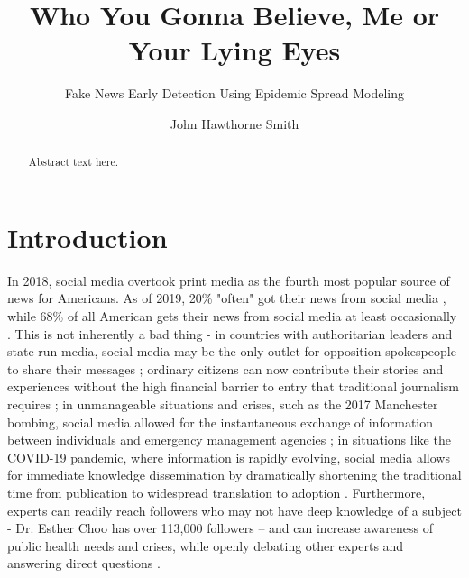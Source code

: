 \documentclass[NETN,manuscript]{stjour-new}
\begin{document}
\title[Who You Gonna Believe?]{Who You Gonna Believe, Me or Your Lying Eyes}
\subtitle{Fake News Early Detection Using Epidemic Spread Modeling}



\author[John Hawthorne Smith]
{John Hawthorne Smith}








\begin{abstract}
Abstract text here.
\end{abstract}



\section{Introduction}
\label{introduction}
In 2018, social media overtook print media as the fourth most popular source of news for Americans. As of 2019, 20\% "often" got their news from social media \citep{shearer2018social}, while 68\% of all American gets their news from social media at least occasionally \citep{matsa2018news}. This is not inherently a bad thing - in countries with authoritarian leaders and state-run media, social media may be the only outlet for opposition spokespeople to share their messages \citep{walker2014breaking}; ordinary citizens can now contribute their stories and experiences without the high financial barrier to entry that traditional journalism requires \citep{qualman2012socialnomics, tapscott2008wikinomics}; in unmanageable situations and crises, such as the 2017 Manchester bombing, social media allowed for the instantaneous exchange of information between individuals and emergency management agencies \citep{mirbabaie2020breaking, eriksson2016facebook}; in situations like the COVID-19 pandemic, where information is rapidly evolving, social media allows for immediate knowledge dissemination by dramatically shortening the traditional time from publication to widespread translation to adoption \citep{chan2020social}. Furthermore, experts can readily reach followers who may not have deep knowledge of a subject - Dr. Esther Choo has over 113,000 followers – and can increase awareness of public health needs and crises, while openly debating other experts and answering direct questions \citep{gottlieb2020information}.
\end{document}

